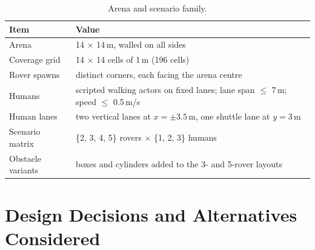 \begin{table}[htbp]
  \centering
  \small
  \caption{Arena and scenario family.}
  \label{tab:scenarios}
  \begin{tabular}{ll}
    \toprule
    Item & Value \\
    \midrule
    Arena & 14 $\times$ 14\,m, walled on all sides \\
    Coverage grid & 14 $\times$ 14 cells of 1\,m (196 cells) \\
    Rover spawns & distinct corners, each facing the arena centre \\
    Humans & scripted walking actors on fixed lanes; lane span $\leq$ 7\,m; speed $\leq$ 0.5\,m/s \\
    Human lanes & two vertical lanes at $x = \pm 3.5$\,m, one shuttle lane at $y = 3$\,m \\
    Scenario matrix & \{2, 3, 4, 5\} rovers $\times$ \{1, 2, 3\} humans \\
    Obstacle variants & boxes and cylinders added to the 3- and 5-rover layouts \\
    \bottomrule
  \end{tabular}
\end{table}


\section{Design Decisions and Alternatives Considered}
\label{sec:sd_rationale}


